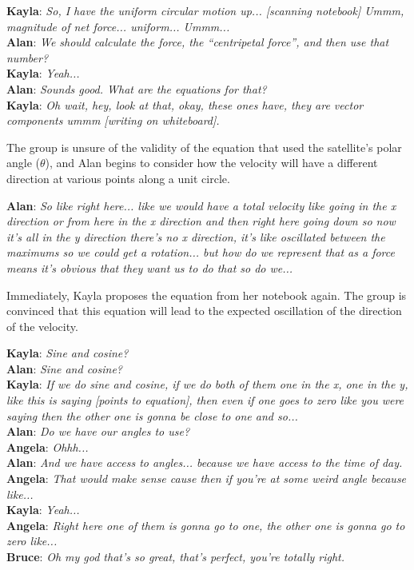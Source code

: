 \documentclass{msuphddissertation}
\begin{document}
\begin{doublespace}
\vspace*{4pt}
\noindent\textbf{Kayla}:  {\it So, I have the uniform circular motion up... [scanning notebook] Ummm, magnitude of net force... uniform... Ummm...}\\
\textbf{Alan}:  {\it We should calculate the force, the ``centripetal force'', and then use that number?}\\
\textbf{Kayla}:  {\it Yeah...}\\
\textbf{Alan}:  {\it Sounds good.  What are the equations for that?}\\
\textbf{Kayla}:  {\it Oh wait, hey, look at that, okay, these ones have, they are vector components ummm [writing on whiteboard].}
\vspace*{4pt}

The group is unsure of the validity of the equation that used the satellite's polar angle ($\theta$), and Alan begins to consider how the velocity will have a different direction at various points along a unit circle.

\vspace*{4pt}
\noindent\textbf{Alan}:  {\it So like right here... like we would have a total velocity like going in the x direction or from here in the x direction and then right here going down so now it's all in the y direction there's no x direction, it's like oscillated between the maximums so we could get a rotation... but how do we represent that as a force means it's obvious that they want us to do that so do we...}
\vspace*{4pt}

Immediately, Kayla proposes the equation from her notebook again.  The group is convinced that this equation will lead to the expected oscillation of the direction of the velocity.

\vspace*{4pt}
\noindent\textbf{Kayla}:  {\it Sine and cosine?}\\
\textbf{Alan}: {\it Sine and cosine?}\\
\textbf{Kayla}: {\it If we do sine and cosine, if we do both of them one in the x, one in the y, like this is saying [points to equation], then even if one goes to zero like you were saying then the other one is gonna be close to one and so...}\\
\textbf{Alan}: {\it Do we have our angles to use?}\\
\textbf{Angela}: {\it Ohhh...}\\
\textbf{Alan}: {\it And we have access to angles... because we have access to the time of day.}\\
\textbf{Angela}: {\it That would make sense cause then if you're at some weird angle because like...}\\
\textbf{Kayla}: {\it Yeah...}\\
\textbf{Angela}: {\it Right here one of them is gonna go to one, the other one is gonna go to zero like...}\\
\textbf{Bruce}: {\it Oh my god that's so great, that's perfect, you're totally right.}
\vspace*{4pt}


\end{doublespace}
\end{document}
